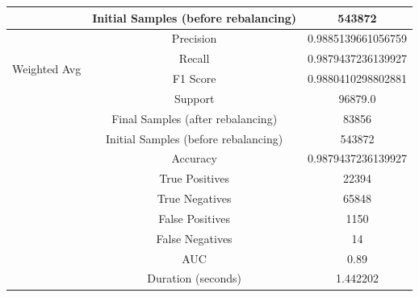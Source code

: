 \begin{longtable}{|c|c|c|}
 & Initial Samples (before rebalancing) & 543872 \\
\hline
\multirow{4}{*}{Weighted Avg} & Precision & 0.9885139661056759 \\
 & Recall & 0.9879437236139927 \\
 & F1 Score & 0.9880410298802881 \\
 & Support & 96879.0 \\
 & Final Samples (after rebalancing) & 83856 \\
 & Initial Samples (before rebalancing) & 543872 \\
\hline
& Accuracy & 0.9879437236139927 \\ \hline
& True Positives & 22394 \\ \hline
& True Negatives & 65848 \\ \hline
& False Positives & 1150 \\ \hline
& False Negatives & 14 \\ \hline
& AUC & 0.89 \\ \hline
& Duration (seconds) & 1.442202 \\ \hline
\end{longtable}


